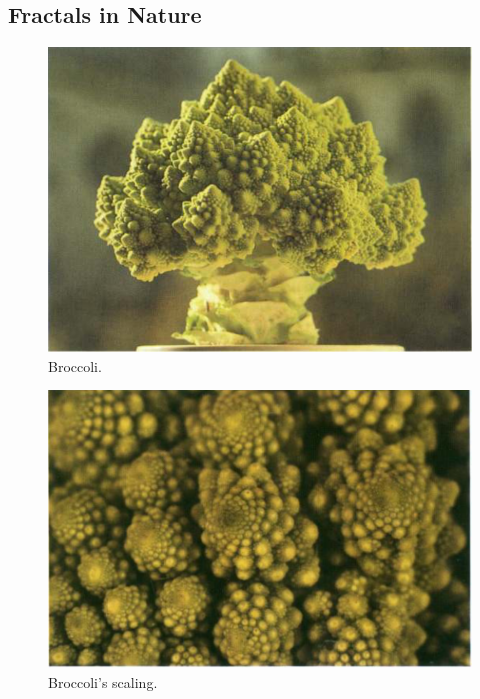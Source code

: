 \subsection{Fractals in Nature}
\begin{figure}[h!]
  \includegraphics[width=\linewidth]{Pictures/broccoli.png}
  \caption{Broccoli.}
  \label{fig:broccoli}
\end{figure}
\begin{figure}[h!]
  \includegraphics[width=\linewidth]{Pictures/broccoli_zoomed.png}
  \caption{Broccoli's scaling.}
  \label{fig:broccoli_zoomed}
\end{figure}
